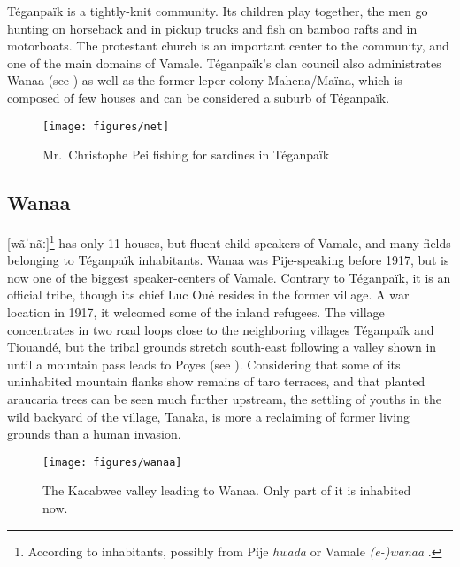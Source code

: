 Téganpaïk is a tightly-knit community. Its children play together, the men go hunting on horseback and in pickup trucks and fish on bamboo rafts and in motorboats. The protestant church is an important center to the community, and one of the main domains of Vamale.
Téganpaïk's clan council also administrates Wanaa (see ) as well as the former leper colony Mahena/Ma\"ina, which is composed of few houses and can be considered a suburb of Téganpaïk.

\begin{figure}
	\texttt{[image: figures/net]}
	\caption{Mr.\ Christophe Pei fishing for sardines in Téganpaïk}
\end{figure}

\subsection{Wanaa}
\label{subsec:Wanaa}
 [wãˈnãː]\footnote{According to inhabitants, possibly from Pije \textit{hwada}  \parencite[106]{haudricourt_dictionnaire_1982} or Vamale \textit{(e-)wanaa} .} has only 11 houses, but fluent child speakers of Vamale, and many fields belonging to Téganpaïk inhabitants. %
Wanaa was Pije-speaking before 1917, but is now one of the biggest speaker-centers of Vamale. Contrary to Téganpaïk, it is an official tribe, though its chief Luc Oué resides in the former village. A war location in 1917, it welcomed some of the inland refugees.
The village concentrates in two road loops close to the neighboring villages Téganpaïk and Tiouandé, but the tribal grounds stretch south-east following a valley shown in  until a mountain pass leads to Poyes (see ).
Considering that some of its uninhabited mountain flanks show remains of taro terraces, and that planted araucaria trees can be seen much further upstream, the settling of youths in the wild backyard of the village, Tanaka, is more a reclaiming of former living grounds than a human invasion.

\begin{figure}
	\centering
	\texttt{[image: figures/wanaa]}
	\caption{The Kacabwec valley leading to Wanaa. Only part of it is inhabited now.}
	\label{fig:wana}
\end{figure}

